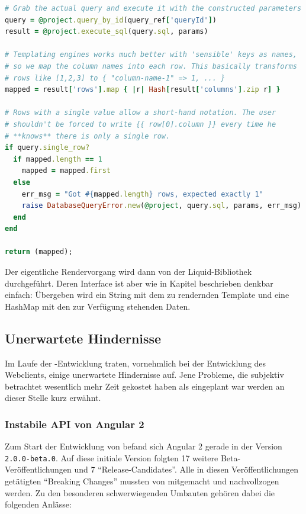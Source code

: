 \begin{lstlisting}[float=h, language=Ruby, caption={Renderdaten einer Abfrage (2): Ausführen und transformieren}, label={lst:server-project-query-map-results}]
# Grab the actual query and execute it with the constructed parameters
query = @project.query_by_id(query_ref['queryId'])
result = @project.execute_sql(query.sql, params)

# Templating engines works much better with 'sensible' keys as names,
# so we map the column names into each row. This basically transforms
# rows like [1,2,3] to { "column-name-1" => 1, ... }
mapped = result['rows'].map { |r| Hash[result['columns'].zip r] }

# Rows with a single value allow a short-hand notation. The user
# shouldn't be forced to write {{ row[0].column }} every time he
# **knows** there is only a single row.
if query.single_row?
  if mapped.length == 1
    mapped = mapped.first
  else
    err_msg = "Got #{mapped.length} rows, expected exactly 1"
    raise DatabaseQueryError.new(@project, query.sql, params, err_msg)
  end
end

return (mapped);
\end{lstlisting}

Der eigentliche Rendervorgang wird dann von der Liquid-Bibliothek durchgeführt. Deren Interface ist aber wie in Kapitel  beschrieben denkbar einfach: Übergeben wird ein String mit dem zu rendernden Template und eine HashMap mit den zur Verfügung stehenden Daten.

\subsection{Unerwartete Hindernisse}
\label{sec:unexpected-problems}

Im Laufe der \idename{}-Entwicklung traten, vornehmlich bei der Entwicklung des Webclients, einige unerwartete Hindernisse auf. Jene Probleme, die subjektiv betrachtet wesentlich mehr Zeit gekostet haben als eingeplant war werden an dieser Stelle kurz erwähnt.

\subsubsection{Instabile API von Angular 2}

Zum Start der Entwicklung von \idename{} befand sich Angular 2 gerade in der Version \texttt{2.0.0-beta.0}. Auf diese initiale Version folgten 17 weitere Beta-Veröffentlichungen und 7 "`Release-Candidates"'. Alle in diesen Veröffentlichungen getätigten "`Breaking Changes"' mussten von \idename{} mitgemacht und nachvollzogen werden. Zu den besonderen schwerwiegenden Umbauten gehören dabei die folgenden Anlässe:

